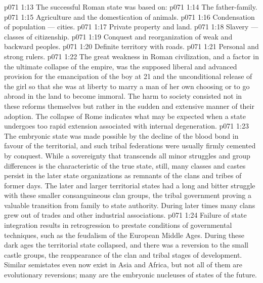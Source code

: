 \vs p071 1:13 \pc The successful Roman state was based on:
\vs p071 1:14 \bibnobreakspace The father\hyp{}family.
\vs p071 1:15 \bibnobreakspace Agriculture and the domestication of animals.
\vs p071 1:16 \bibnobreakspace Condensation of population --- cities.
\vs p071 1:17 \bibnobreakspace Private property and land.
\vs p071 1:18 \bibnobreakspace Slavery --- classes of citizenship.
\vs p071 1:19 \bibnobreakspace Conquest and reorganization of weak and backward peoples.
\vs p071 1:20 \bibnobreakspace Definite territory with roads.
\vs p071 1:21 \bibnobreakspace Personal and strong rulers.
\vs p071 1:22 \pc The great weakness in Roman civilization, and a factor in the ultimate collapse of the empire, was the supposed liberal and advanced provision for the emancipation of the boy at 21 and the unconditional release of the girl so that she was at liberty to marry a man of her own choosing or to go abroad in the land to become immoral. The harm to society consisted not in these reforms themselves but rather in the sudden and extensive manner of their adoption. The collapse of Rome indicates what may be expected when a state undergoes too rapid extension associated with internal degeneration.
\vs p071 1:23 \pc The embryonic state was made possible by the decline of the blood bond in favour of the territorial, and such tribal federations were usually firmly cemented by conquest. While a sovereignty that transcends all minor struggles and group differences is the characteristic of the true state, still, many classes and castes persist in the later state organizations as remnants of the clans and tribes of former days. The later and larger territorial states had a long and bitter struggle with these smaller consanguineous clan groups, the tribal government proving a valuable transition from family to state authority. During later times many clans grew out of trades and other industrial associations.
\vs p071 1:24 Failure of state integration results in retrogression to prestate conditions of governmental techniques, such as the feudalism of the European Middle Ages. During these dark ages the territorial state collapsed, and there was a reversion to the small castle groups, the reappearance of the clan and tribal stages of development. Similar semistates even now exist in Asia and Africa, but not all of them are evolutionary reversions; many are the embryonic nucleuses of states of the future.
